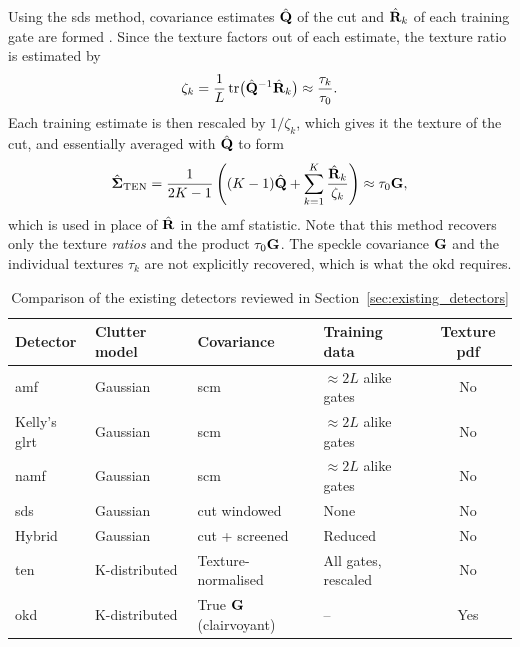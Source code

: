 \documentclass[12pt, a4paper]{report}
\begin{document}
Using the \gls{sds} method, covariance estimates $\hat{\mathbf{Q}}$ of the \gls{cut} and $\hat{\mathbf{R}}_k$ of each training gate are formed \cite{Aboutanios2005}. Since the texture factors out of each estimate, the texture ratio is estimated by
\begin{equation}
    \zeta_k = \frac{1}{L}\operatorname{tr}\!\big(\hat{\mathbf{Q}}^{-1}\hat{\mathbf{R}}_k\big) \approx \frac{\tau_k}{\tau_0}.
    \label{eq:ten_ratio}
\end{equation}
Each training estimate is then rescaled by $1/\zeta_k$, which gives it the texture of the \gls{cut}, and essentially averaged with $\hat{\mathbf{Q}}$ to form
\begin{equation}
    \hat{\mathbf{\Sigma}}_\text{TEN} = \frac{1}{2K-1}\left((K-1)\hat{\mathbf{Q}} + \sum_{k=1}^{K}\frac{\hat{\mathbf{R}}_k}{\zeta_k}\right) \approx \tau_0\mathbf{G},
    \label{eq:ten_cov}
\end{equation}
which is used in place of $\hat{\mathbf{R}}$ in the \gls{amf} statistic. Note that this method recovers only the texture \emph{ratios} and the product $\tau_0\mathbf{G}$. The speckle covariance $\mathbf{G}$ and the individual textures $\tau_k$ are not explicitly recovered, which is what the \gls{okd} requires. \\

\vspace{5mm}
\begin{table}[htbp]
    \centering
    \caption{Comparison of the existing detectors reviewed in Section~\ref{sec:existing_detectors}}
    \label{tab:detector_comparison}
    \footnotesize
    \renewcommand{\arraystretch}{1.35}\setlength{\tabcolsep}{4pt}
    \begin{tabular}{@{}l l l l c@{}}
        \hline
        Detector & Clutter model & Covariance & Training data & Texture pdf \\
        \hline
        \acrshort{amf} \cite{Chen1991} & Gaussian & \acrshort{scm} & $\approx 2L$ alike gates & No \\
        Kelly's \acrshort{glrt} \cite{Kelly1986} & Gaussian & \acrshort{scm} & $\approx 2L$ alike gates & No \\
        \acrshort{namf} \cite{Kraut1999} & Gaussian & \acrshort{scm} & $\approx 2L$ alike gates & No \\
        \acrshort{sds} \cite{Aboutanios2005} & Gaussian & \acrshort{cut} windowed & None & No \\
        Hybrid \cite{Aboutanios2010} & Gaussian & \acrshort{cut} + screened & Reduced & No \\
        \acrshort{ten} \cite{Aboutanios2020} & K-distributed & Texture-normalised & All gates, rescaled & No \\
        \acrshort{okd} \cite{Gini1998} & K-distributed & True $\mathbf{G}$ (clairvoyant) & -- & Yes \\
        \hline
    \end{tabular}
\end{table}
\vspace{5mm}
\end{document}
